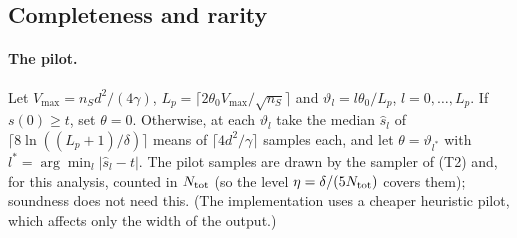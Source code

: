 \subsection{Completeness and rarity}

\paragraph{The pilot.} Let $V_{\max}=n_Sd^2/(4\gamma)$, $L_p=\lceil2\theta_0V_{\max}/\sqrt{n_S}\rceil$ and
$\vartheta_l=l\theta_0/L_p$, $l=0,\dots,L_p$. If $s(0)\ge t$, set $\theta=0$. Otherwise, at each
$\vartheta_l$ take the median $\hat s_l$ of $\lceil8\ln((L_p+1)/\delta)\rceil$ means of
$\lceil4d^2/\gamma\rceil$ samples each, and let $\theta=\vartheta_{l^*}$ with
$l^*=\arg\min_l|\hat s_l-t|$. The pilot samples are drawn by the sampler of (T2) and, for
this analysis, counted in $N_{\rm tot}$ (so the level $\eta=\delta/(5N_{\rm tot})$ covers them);
soundness does not need this. (The implementation uses a cheaper heuristic pilot, which
affects only the width of the output.)

